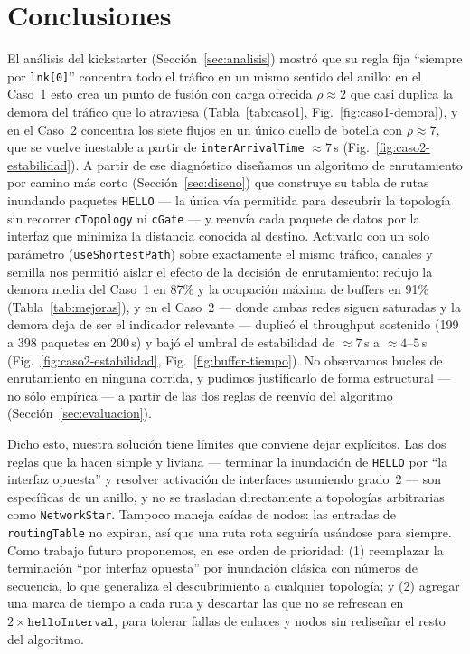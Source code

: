 \documentclass[10pt,letterpaper,twocolumn]{article}
\begin{document}
\section{Conclusiones}
\label{sec:conclusiones}

El análisis del kickstarter (Sección~\ref{sec:analisis}) mostró que su regla
fija ``siempre por \texttt{lnk[0]}'' concentra todo el tráfico en un mismo
sentido del anillo: en el Caso~1 esto crea un punto de fusión con carga
ofrecida $\rho \approx 2$ que casi duplica la demora del tráfico que lo
atraviesa (Tabla~\ref{tab:caso1}, Fig.~\ref{fig:caso1-demora}), y en el Caso~2
concentra los siete flujos en un único cuello de botella con $\rho \approx 7$,
que se vuelve inestable a partir de \texttt{interArrivalTime} $\approx 7$\,s
(Fig.~\ref{fig:caso2-estabilidad}). A partir de ese diagnóstico diseñamos un
algoritmo de enrutamiento por camino más corto (Sección~\ref{sec:diseno}) que
construye su tabla de rutas inundando paquetes \texttt{HELLO} --- la única vía
permitida para descubrir la topología sin recorrer \texttt{cTopology} ni
\texttt{cGate} --- y reenvía cada paquete de datos por la interfaz que minimiza
la distancia conocida al destino. Activarlo con un solo parámetro
(\texttt{useShortestPath}) sobre exactamente el mismo tráfico, canales y
semilla nos permitió aislar el efecto de la decisión de enrutamiento: redujo la
demora media del Caso~1 en 87\% y la ocupación máxima de buffers en 91\%
(Tabla~\ref{tab:mejoras}), y en el Caso~2 --- donde ambas redes siguen
saturadas y la demora deja de ser el indicador relevante --- duplicó el
throughput sostenido (199 a 398 paquetes en 200\,s) y bajó el umbral de
estabilidad de $\approx 7$\,s a $\approx 4$--$5$\,s
(Fig.~\ref{fig:caso2-estabilidad}, Fig.~\ref{fig:buffer-tiempo}). No
observamos bucles de enrutamiento en ninguna corrida, y pudimos justificarlo de
forma estructural --- no sólo empírica --- a partir de las dos reglas de
reenvío del algoritmo (Sección~\ref{sec:evaluacion}).

Dicho esto, nuestra solución tiene límites que conviene dejar explícitos. Las
dos reglas que la hacen simple y liviana --- terminar la inundación de
\texttt{HELLO} por ``la interfaz opuesta'' y resolver activación de interfaces
asumiendo grado~2 --- son específicas de un anillo, y no se trasladan
directamente a topologías arbitrarias como \texttt{NetworkStar}.
Tampoco maneja caídas de nodos: las entradas de
\texttt{routingTable} no expiran, así que una ruta rota seguiría usándose para
siempre. Como trabajo futuro proponemos, en ese orden de prioridad: (1)
reemplazar la terminación ``por interfaz opuesta'' por inundación clásica con
números de secuencia, lo que generaliza el descubrimiento a cualquier
topología; y (2) agregar una marca de tiempo a cada ruta y descartar las que no
se refrescan en $2\times\texttt{helloInterval}$, para tolerar fallas de
enlaces y nodos sin rediseñar el resto del algoritmo.
\end{document}
